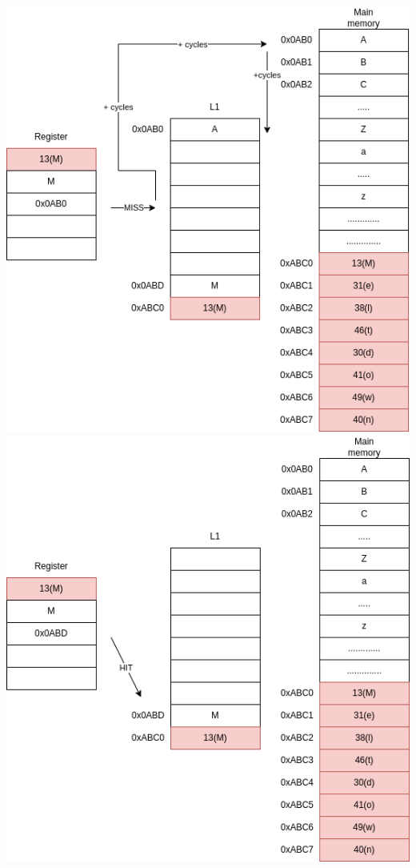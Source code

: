 \includegraphics[scale=0.25]{img/meltdown-step-two.png}
\newline
\includegraphics[scale=0.25]{img/meltdown-step-four.png}
